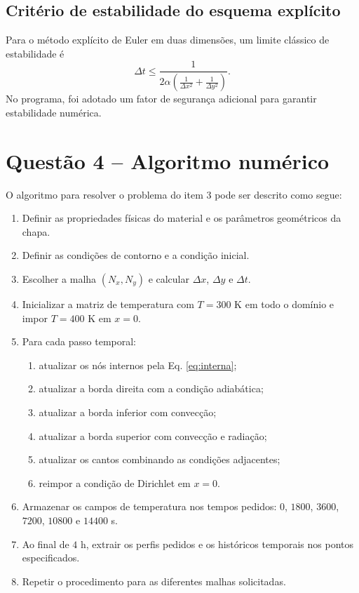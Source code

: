 \documentclass[12pt,a4paper]{article}
\begin{document}
\subsection{Critério de estabilidade do esquema explícito}
Para o método explícito de Euler em duas dimensões, um limite clássico de estabilidade é
\begin{equation}
\Delta t \leq \frac{1}{2\alpha\left(\frac{1}{\Delta x^2}+\frac{1}{\Delta y^2}\right)}.
\end{equation}
No programa, foi adotado um fator de segurança adicional para garantir estabilidade numérica.

\section{Questão 4 -- Algoritmo numérico}
O algoritmo para resolver o problema do item 3 pode ser descrito como segue:

\begin{enumerate}
    \item Definir as propriedades físicas do material e os parâmetros geométricos da chapa.
    \item Definir as condições de contorno e a condição inicial.
    \item Escolher a malha $(N_x,N_y)$ e calcular $\Delta x$, $\Delta y$ e $\Delta t$.
    \item Inicializar a matriz de temperatura com $T=300$ K em todo o domínio e impor $T=400$ K em $x=0$.
    \item Para cada passo temporal:
    \begin{enumerate}
        \item atualizar os nós internos pela Eq. \eqref{eq:interna};
        \item atualizar a borda direita com a condição adiabática;
        \item atualizar a borda inferior com convecção;
        \item atualizar a borda superior com convecção e radiação;
        \item atualizar os cantos combinando as condições adjacentes;
        \item reimpor a condição de Dirichlet em $x=0$.
    \end{enumerate}
    \item Armazenar os campos de temperatura nos tempos pedidos: $0$, $1800$, $3600$, $7200$, $10800$ e $14400$ s.
    \item Ao final de $4$ h, extrair os perfis pedidos e os históricos temporais nos pontos especificados.
    \item Repetir o procedimento para as diferentes malhas solicitadas.
\end{enumerate}
\end{document}
